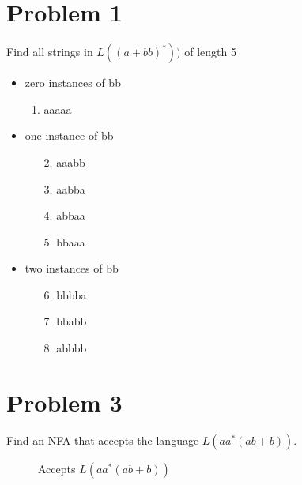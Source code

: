 \documentclass{report}
\begin{document}
    \section*{Problem 1}
    Find all strings in $L((a+bb)^*))$ of length 5
    \begin{itemize}
        \item zero instances of bb
        \begin{enumerate}
            \item aaaaa
        \end{enumerate}

        \item one instance of bb
        \begin{enumerate}
            \item[2.] aaabb
            \item[3.] aabba
            \item[4.] abbaa
            \item[5.] bbaaa
        \end{enumerate}

        \item two instances of bb
        \begin{enumerate}
            \item[6.] bbbba
            \item[7.] bbabb
            \item[8.] abbbb
        \end{enumerate}
    \end{itemize}

    \section*{Problem 3}
    Find an NFA that accepts the language $L(aa^* (ab + b))$.

    \begin{figure}[ht] %
        \centering %
        \caption{Accepts $L(aa^* (ab + b))$}
        \label{fig:p3}
    \end{figure}
\end{document}
